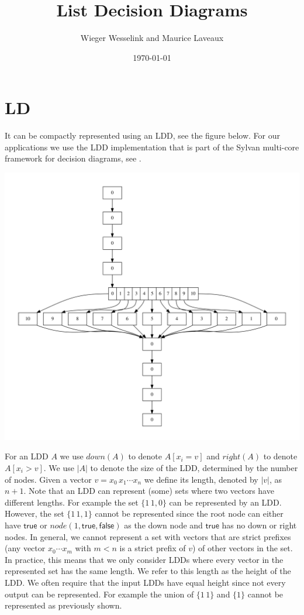 \documentclass{article}
\title{List Decision Diagrams}
\author{Wieger Wesselink and Maurice Laveaux}
\date{\today}
\newcommand{\var}[1]{\ensuremath{\textit{#1}}}
\newcommand{\lddright}{\textit{right}}
\newcommand{\ldddown}{\textit{down}}
\begin{document}
\newpage
\section{LD}

It can be compactly
represented using an LDD, see the figure below. For our applications we use the LDD implementation that is part of the Sylvan multi-core framework for decision diagrams, see
\cite{DBLP:journals/sttt/DijkP17}.

\includegraphics[width=15cm]{ldd_if_then.pdf}

For an LDD $A$ we use $\ldddown(A)$ to denote $A[x_i = v]$ and $\lddright(A)$ to denote $A[x_i > v]$.
We use $|A|$ to denote the size of the LDD, determined by the number of nodes.
Given a vector $v = x_0\,x_1 \cdots x_n$ we define its length, denoted by $|v|$, as $n + 1$.
Note that an LDD can represent (some) sets where two vectors have different lengths.
For example the set $\{1\,1, 0\}$ can be represented by an LDD.
However, the set $\{1\,1, 1\}$ cannot be represented since the root node can either have $\textsf{true}$ or $\var{node}(1, \textsf{true}, \textsf{false})$ as the down node and $\textsf{true}$ has no down or right nodes.
In general, we cannot represent a set with vectors that are strict prefixes (any vector $x_0 \cdots x_m$ with $m < n$ is a strict prefix of $v$) of other vectors in the set.
In practice, this means that we only consider LDDs where every vector in the represented set has the same length.
We refer to this length as the height of the LDD.
We often require that the input LDDs have equal height since not every output can be represented.
For example the union of $\{1\,1\}$ and $\{1\}$ cannot be represented as previously shown.
\end{document}
